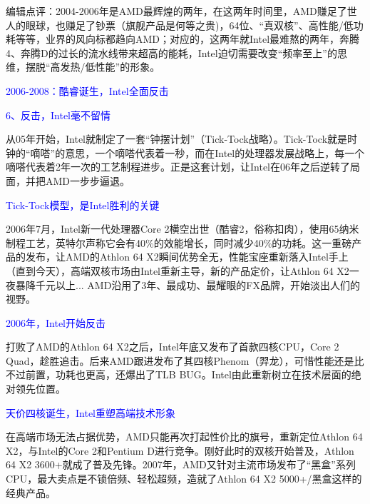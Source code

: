 \documentclass[utf8]{book}
\begin{document}
	编辑点评：2004-2006年是AMD最辉煌的两年，在这两年时间里，AMD赚足了世人的眼球，也赚足了钞票（旗舰产品是何等之贵)，64位、“真双核”、高性能/低功耗等等，业界的风向标都趋向AMD；对应的，这两年就Intel最难熬的两年，奔腾4、奔腾D的过长的流水线带来超高的能耗，Intel迫切需要改变“频率至上”的思维，摆脱“高发热/低性能”的形象。
	
	\begin{flushleft}
		{\Large \textcolor{blue}{2006-2008：酷睿诞生，Intel全面反击}}
	\end{flushleft}
	
	\begin{flushleft}
		{\large \textcolor{blue}{6、反击，Intel毫不留情\\}}
	\end{flushleft}

	从05年开始，Intel就制定了一套“钟摆计划”（Tick-Tock战略）。Tick-Tock就是时钟的“嘀嗒”的意思，一个嘀嗒代表着一秒，而在Intel的处理器发展战略上，每一个嘀嗒代表着2年一次的工艺制程进步。正是这套计划，让Intel在06年之后逆转了局面，并把AMD一步步逼退。
	
	
	\begin{flushleft}
		{\large \textcolor{blue}{Tick-Tock模型，是Intel胜利的关键\\}}
	\end{flushleft}

	2006年7月，Intel新一代处理器Core 2横空出世（酷睿2，俗称扣肉），使用65纳米制程工艺，英特尔声称它会有40\%的效能增长，同时减少40\%的功耗。这一重磅产品的发布，让AMD的Athlon 64 X2瞬间优势全无，性能宝座重新落入Intel手上（直到今天），高端双核市场由Intel重新主导，新的产品定价，让Athlon 64 X2一夜暴降千元以上... AMD沿用了3年、最成功、最耀眼的FX品牌，开始淡出人们的视野。
	
	\begin{flushleft}
		{\large \textcolor{blue}{2006年，Intel开始反击\\}}
	\end{flushleft}

	打败了AMD的Athlon 64 X2之后，Intel年底又发布了首款四核CPU，Core 2 Quad，趁胜追击。后来AMD跟进发布了其四核Phenom（羿龙），可惜性能还是比不过前置，功耗也更高，还爆出了TLB BUG。Intel由此重新树立在技术层面的绝对领先位置。
	
	\begin{flushleft}
		{\large \textcolor{blue}{天价四核诞生，Intel重塑高端技术形象\\}}
	\end{flushleft}

	在高端市场无法占据优势，AMD只能再次打起性价比的旗号，重新定位Athlon 64 X2，与Intel的Core 2和Pentium D进行竞争。刚好此时的双核开始普及，Athlon 64 X2 3600+就成了普及先锋。2007年，AMD又针对主流市场发布了“黑盒”系列CPU，最大卖点是不锁倍频、轻松超频，造就了Athlon 64 X2 5000+/黑盒这样的经典产品。
	
\end{document}
